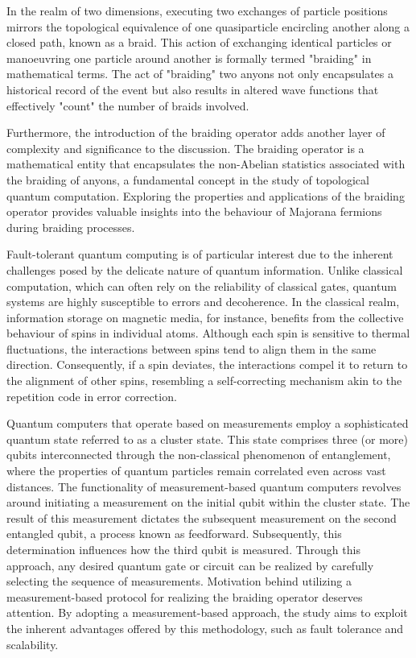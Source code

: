 \documentclass{article}
\begin{document}
In the realm of two dimensions, executing two exchanges of particle positions mirrors the topological equivalence of one quasiparticle encircling another along a closed path, known as a braid. This action of exchanging identical particles or manoeuvring one particle around another is formally termed "braiding" in mathematical terms. The act of "braiding" two anyons not only encapsulates a historical record of the event but also results in altered wave functions that effectively "count" the number of braids involved.\cite{Nakamura_2020}

Furthermore, the introduction of the braiding operator adds another layer of complexity and significance to the discussion. The braiding operator is a mathematical entity that encapsulates the non-Abelian statistics associated with the braiding of anyons, a fundamental concept in the study of topological quantum computation. Exploring the properties and applications of the braiding operator provides valuable insights into the behaviour of Majorana fermions during braiding processes.

Fault-tolerant quantum computing is of particular interest due to the inherent challenges posed by the delicate nature of quantum information. Unlike classical computation, which can often rely on the reliability of classical gates, quantum systems are highly susceptible to errors and decoherence. In the classical realm, information storage on magnetic media, for instance, benefits from the collective behaviour of spins in individual atoms. Although each spin is sensitive to thermal fluctuations, the interactions between spins tend to align them in the same direction. Consequently, if a spin deviates, the interactions compel it to return to the alignment of other spins, resembling a self-correcting mechanism akin to the repetition code in error correction.\cite{Kitaev_2003}

Quantum computers that operate based on measurements employ a sophisticated quantum state referred to as a cluster state. This state comprises three (or more) qubits interconnected through the non-classical phenomenon of entanglement, where the properties of quantum particles remain correlated even across vast distances. The functionality of measurement-based quantum computers revolves around initiating a measurement on the initial qubit within the cluster state. The result of this measurement dictates the subsequent measurement on the second entangled qubit, a process known as feedforward. Subsequently, this determination influences how the third qubit is measured. Through this approach, any desired quantum gate or circuit can be realized by carefully selecting the sequence of measurements.\cite{quantum_comp} Motivation behind utilizing a measurement-based protocol for realizing the braiding operator deserves attention. By adopting a measurement-based approach, the study aims to exploit the inherent advantages offered by this methodology, such as fault tolerance and scalability.
\end{document}
